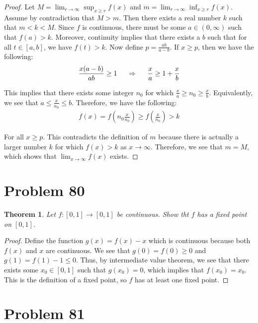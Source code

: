 \documentclass[psamsfonts]{amsart}
\newtheorem{thm}{Theorem}[section]
\theoremstyle{definition}
\theoremstyle{remark}
\numberwithin{equation}{section}
\begin{document}
\begin{proof}
Let $M = \lim_{r \to \infty} \sup_{x \geq r} f(x)$ and $m = \lim_{r \to \infty} \inf_{x \geq r} f(x)$. Assume by contradiction that $M > m$. Then there exists a real number $k$ such that $m < k < M$. Since $f$ is continuous, there must be some $a \in (0,\infty)$ such that $f(a) > k$. Moreover, continuity implies that there exists a $b$ such that for all $t \in [a,b]$, we have $f(t) > k$. Now define $p = \frac{ab}{a-b}$. If $x \geq p$, then we have the following:
\begin{eqnarray}
\frac{x(a-b)}{ab} \geq 1 \hspace{0.5cm} \Rightarrow \hspace{0.5cm} \frac{x}{a} \geq 1 +\frac{x}{b}
\end{eqnarray}

This implies that there exists some integer $n_0$ for which $\frac{x}{a} \geq n_0 \geq \frac{x}{b}$. Equivalently, we see that $a \leq \frac{x}{n_0} \leq b$. Therefore, we have the following:
\begin{eqnarray}
f(x) = f \left( n_0 \frac{x}{n_0} \right) \geq f \left( \frac{x}{n_0} \right) > k
\end{eqnarray}

For all $x \geq p$. This contradicts the definition of $m$ because there is actually a larger number $k$ for which $f(x) > k$ as $x \to \infty$. Therefore, we see that $m = M$, which shows that $\lim_{x \to \infty} f(x)$ exists. 
\end{proof}

\section{Problem 80}

\begin{thm}
Let $f:[0,1] \to [0,1]$ be continuous. Show tht $f$ has a fixed point on $[0,1]$.
\end{thm}

\begin{proof}
Define the function $g(x) = f(x) - x$ which is continuous because both $f(x)$ and $x$ are continuous. We see that $g(0) = f(0) \geq 0$ and $g(1) = f(1) - 1 \leq 0$. Thus, by intermediate value theorem, we see that there exists some $x_0 \in [0,1]$ such that $g(x_0) = 0$, which implies that $f(x_0) = x_0$. This is the definition of a fixed point, so $f$ has at least one fixed point. 
\end{proof}

\section{Problem 81}
\end{document}
